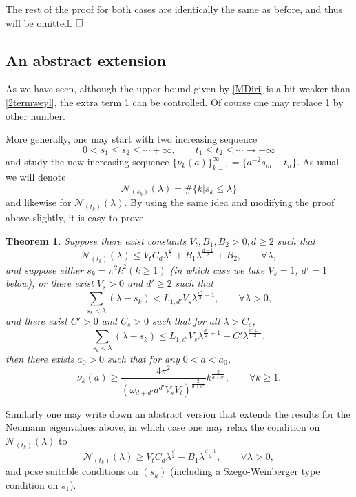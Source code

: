 \documentclass[11pt,letterpaper]{amsart}
\numberwithin{equation}{section}
\theoremstyle{plain}
\newtheorem{theorem}{Theorem}[section]
\theoremstyle{plain}
\numberwithin{equation}{section}
\theoremstyle{remark}
\begin{document}
	The rest of the proof for both cases are identically the same as before, and thus will be omitted.  $\hfill\square$
	
	\subsection{An abstract extension}
	
	As we have seen, although the upper bound given by \eqref{MDiri} is a bit weaker than  \eqref{2termweyl}, the  extra term 1 can be controlled. Of course one may replace 1 by other number. 
	
	More generally, one may start with two  increasing sequence
	\[0 < s_1 \le s_2 \le \cdots +\infty, \qquad t_1 \le t_2 \le \cdots \to +\infty \]
	and study the new increasing sequence   $\{\nu_k(a)\}_{k=1}^\infty=\{a^{-2} s_m+t_n \}$. As usual we will denote 
	\[\mathcal N_{(s_k)}(\lambda)=\#\{k  | s_k \le \lambda\}\]
	and likewise for $\mathcal N_{(t_k)}(\lambda)$. 
	By using the same idea and modifying the proof above slightly, it is easy to prove
	\begin{theorem} 
		Suppose there exist constants $V_t, B_1, B_2>0,d\ge 2$ such that 
		\begin{equation}\label{UBforN}
			\mathcal  N_{(t_k)}(\lambda) \le V_t C_{d} \lambda^{\frac d2}+B_1 \lambda^{\frac{d-1}2} + B_2, \qquad \forall \lambda,
		\end{equation} 
		and suppose   either  $s_k= \pi^2 k^2 (k \ge 1)$ (in which case we take $V_s=1$, $d'=1$ below), or there exist  $V_s >0$ and $d' \ge 2$ such that \[\sum_{s_k<\lambda}(\lambda-s_k)<L_{1,{d'}}V_s \lambda^{\frac {d'}2+1},\qquad \forall \lambda>0,\]
		and there exist  $C'>0$ and $C_s>0$ such that  for all $\lambda>C_s$, 
		\[ \sum_{s_k<\lambda}(\lambda-s_k) \le L_{1,d'}V_s \lambda^{\frac {d'}2+1}-C'\lambda^{\frac{d'+1}{2}},\]
		then there exists $a_0>0$ such that for any $0<a<a_0$, 
		\[
		\nu_k(a) \ge \frac{4\pi^2}{(\omega_{d+d'}a^{d'}V_sV_t)^{\frac{2}{d+d'}}} k^{\frac{2}{d+d'}},\qquad \forall k\ge 1.
		\]
		

	\end{theorem}
	
	Similarly one may write down an abstract version that extends the results for the Neumann eigenvalues above, in which case one may relax the condition on $\mathcal N_{(t_k)}(\lambda)$ to 
	\begin{equation}\label{LBforN}
		\mathcal  N_{(t_k)}(\lambda) \ge V_t C_{d} \lambda^{\frac d2}-B_1 \lambda^{\frac{d-1}2}, \qquad \forall \lambda>0,
	\end{equation} 
	and pose suitable conditions on $(s_k)$ (including a Szeg\"o-Weinberger type condition on $s_1$). 
	
\end{document}
